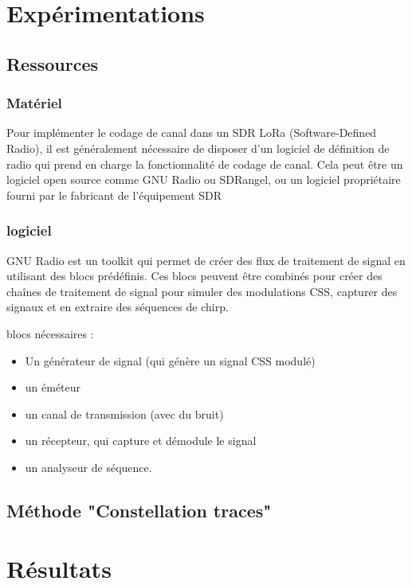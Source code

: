 \documentclass[12pt,a4paper,oneside, titlepage]{report}
\begin{document}
\newpage

\chapter{Expérimentations}

\section{Ressources}

\subsection{Matériel}

Pour implémenter le codage de canal dans un SDR LoRa (Software-Defined Radio), il est généralement nécessaire de disposer d'un logiciel de définition de radio qui prend en charge la fonctionnalité de codage de canal. Cela peut être un logiciel open source comme GNU Radio ou SDRangel, ou un logiciel propriétaire fourni par le fabricant de l'équipement SDR

\subsection{logiciel}

GNU Radio est un toolkit qui permet de créer des flux de traitement de signal en utilisant des blocs prédéfinis. Ces blocs peuvent être combinés pour créer des chaînes de traitement de signal pour simuler des modulations CSS, capturer des signaux et en extraire des séquences de chirp.


blocs nécessaires :
\begin{itemize}
\item Un générateur de signal (qui génère un signal CSS modulé)
\item un éméteur
\item un canal de transmission (avec du bruit)
\item un récepteur, qui capture et démodule le signal
\item un analyseur de séquence.
\end{itemize}

\section{Méthode "Constellation traces"}

\chapter{Résultats}
\end{document}
